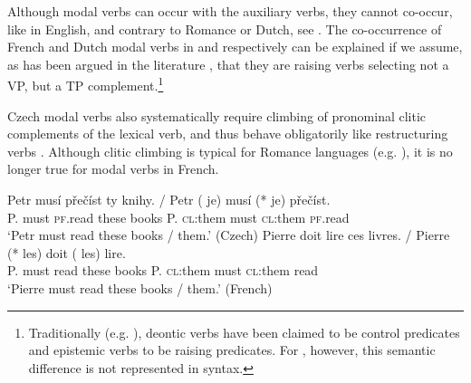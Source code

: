 \documentclass[output=paper,colorlinks,citecolor=brown,
modfonts
]{langscibook}
\begin{document}
\noindent Although modal verbs can occur with the auxiliary verbs, they cannot co-occur, like in English, and contrary to Romance or Dutch, see . The co-occurrence of French and Dutch modal verbs in  and  respectively can be explained if we assume, as has been argued in the literature \citep{Ruwet1972,Wurmbrand1999,Wurmbrand2001}, that they are raising verbs selecting not a VP, but a TP complement.\footnote{Traditionally (e.g. \citealt{Ross1969a}), deontic verbs have been claimed to be control predicates and epistemic verbs to be raising predicates. For \cite{Wurmbrand1999}, however, this semantic difference is not represented in syntax.}

\ea\label{15} 
\z\z

\noindent Czech modal verbs also systematically require climbing of pronominal clitic complements of the lexical verb, and thus behave obligatorily like restructuring verbs \citep{Medová2000}. Although clitic climbing is typical for Romance languages (e.g. \citealt{Rizzi1978,Roberts1991}), it is no longer true for modal verbs in French. 

\begin{exe}
\ex \label{16} 
\begin{xlist}
\ex\label{16a}
\gll Petr musí přečíst  ty  knihy.  / Petr (\hspace{-2pt} je) musí (*\hspace{-2pt} je)   přečíst. \\
P.    must \textsc{pf}.read these books   {} P.  {} \textsc{cl}:them must {} \textsc{cl}:them \textsc{pf}.read\\
\glt   `Petr must read these books / them.' \hfill (Czech)
\ex \label{16b}
\gll  Pierre doit  lire   ces livres.  /  Pierre (*\hspace{-2pt} les)  doit  (\hspace{-2pt} les)  lire.\\
P.  must read these books  {} P.   {} \textsc{cl}:them must {} \textsc{cl}:them read\\
\glt `Pierre must read these books / them.' \hfill (French)
\end{xlist}
\end{exe}
\end{document}
